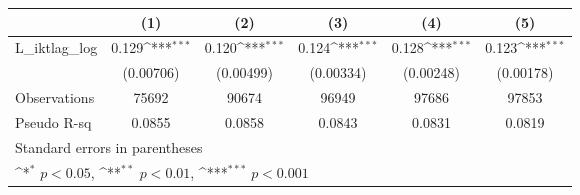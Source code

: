 {
\def\sym#1{\ifmmode^{#1}\else\(^{#1}\)\fi}
\begin{tabular}{l*{5}{c}}
\hline\hline
                &\multicolumn{1}{c}{(1)}         &\multicolumn{1}{c}{(2)}         &\multicolumn{1}{c}{(3)}         &\multicolumn{1}{c}{(4)}         &\multicolumn{1}{c}{(5)}         \\
\hline
L\_iktlag\_log    &    0.129\sym{***}&    0.120\sym{***}&    0.124\sym{***}&    0.128\sym{***}&    0.123\sym{***}\\
                &(0.00706)         &(0.00499)         &(0.00334)         &(0.00248)         &(0.00178)         \\
\hline
Observations    &    75692         &    90674         &    96949         &    97686         &    97853         \\
Pseudo R-sq     &   0.0855         &   0.0858         &   0.0843         &   0.0831         &   0.0819         \\
\hline\hline
\multicolumn{6}{l}{\footnotesize Standard errors in parentheses}\\
\multicolumn{6}{l}{\footnotesize \sym{*} \(p<0.05\), \sym{**} \(p<0.01\), \sym{***} \(p<0.001\)}\\
\end{tabular}
}
